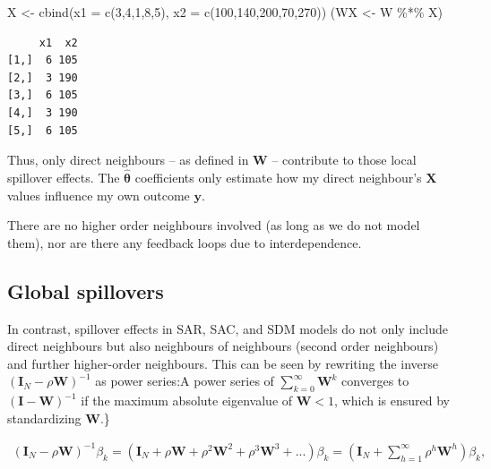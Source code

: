 \documentclass[
  letterpaper,
  DIV=11,
  numbers=noendperiod]{scrreprt}
\newenvironment{Shaded}{\begin{snugshade}}{\end{snugshade}}
\newcommand{\AttributeTok}[1]{\textcolor[rgb]{0.40,0.45,0.13}{#1}}
\newcommand{\DecValTok}[1]{\textcolor[rgb]{0.68,0.00,0.00}{#1}}
\newcommand{\FunctionTok}[1]{\textcolor[rgb]{0.28,0.35,0.67}{#1}}
\newcommand{\NormalTok}[1]{\textcolor[rgb]{0.00,0.23,0.31}{#1}}
\newcommand{\OtherTok}[1]{\textcolor[rgb]{0.00,0.23,0.31}{#1}}
\newcommand{\SpecialCharTok}[1]{\textcolor[rgb]{0.37,0.37,0.37}{#1}}
\begin{document}
\begin{Shaded}
\begin{Highlighting}[]
\NormalTok{X }\OtherTok{\textless{}{-}} \FunctionTok{cbind}\NormalTok{(}\AttributeTok{x1 =} \FunctionTok{c}\NormalTok{(}\DecValTok{3}\NormalTok{,}\DecValTok{4}\NormalTok{,}\DecValTok{1}\NormalTok{,}\DecValTok{8}\NormalTok{,}\DecValTok{5}\NormalTok{),}
           \AttributeTok{x2 =} \FunctionTok{c}\NormalTok{(}\DecValTok{100}\NormalTok{,}\DecValTok{140}\NormalTok{,}\DecValTok{200}\NormalTok{,}\DecValTok{70}\NormalTok{,}\DecValTok{270}\NormalTok{))}
\NormalTok{(WX }\OtherTok{\textless{}{-}}\NormalTok{  W }\SpecialCharTok{\%*\%}\NormalTok{ X)}
\end{Highlighting}
\end{Shaded}

\begin{verbatim}
     x1  x2
[1,]  6 105
[2,]  3 190
[3,]  6 105
[4,]  3 190
[5,]  6 105
\end{verbatim}

Thus, only direct neighbours -- as defined in
\({\boldsymbol{\mathbf{W}}}\) -- contribute to those local spillover
effects. The \(\hat{\boldsymbol{\mathbf{\theta}}}\) coefficients only
estimate how my direct neighbour's \(\boldsymbol{\mathbf{X}}\) values
influence my own outcome \(\boldsymbol{\mathbf{y}}\).

There are no higher order neighbours involved (as long as we do not
model them), nor are there any feedback loops due to interdependence.

\hypertarget{global-spillovers}{%
\subsection{Global spillovers}\label{global-spillovers}}

In contrast, spillover effects in SAR, SAC, and SDM models do not only
include direct neighbours but also neighbours of neighbours (second
order neighbours) and further higher-order neighbours. This can be seen
by rewriting the inverse
\(({\boldsymbol{\mathbf{I}}_N}-\rho {\boldsymbol{\mathbf{W}}})^{-1}\) as
power series:A power series of
\(\sum\nolimits_{k=0}^\infty {\boldsymbol{\mathbf{W}}}^k\) converges to
\(({\boldsymbol{\mathbf{I}}}-{\boldsymbol{\mathbf{W}}})^{-1}\) if the
maximum absolute eigenvalue of \({\boldsymbol{\mathbf{W}}} < 1\), which
is ensured by standardizing \({\boldsymbol{\mathbf{W}}}\).\}

\[
\begin{split}
({\boldsymbol{\mathbf{I}}_N}-\rho {\boldsymbol{\mathbf{W}}})^{-1}\beta_k 
=({\boldsymbol{\mathbf{I}}_N} + \rho{\boldsymbol{\mathbf{W}}} + \rho^2{\boldsymbol{\mathbf{W}}}^2 + \rho^3{\boldsymbol{\mathbf{W}}}^3 + ...)\beta_k 
= ({\boldsymbol{\mathbf{I}}_N} + \sum_{h=1}^\infty \rho^h{\boldsymbol{\mathbf{W}}}^h)\beta_k ,
\end{split}
\]
\end{document}
